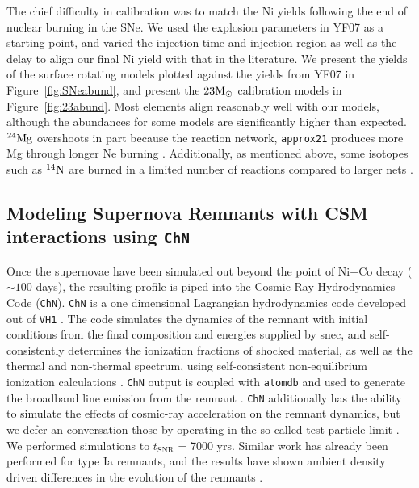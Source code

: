 \documentclass[twocolumn]{aastex631}
\begin{document}
The chief difficulty in calibration was to match the Ni yields following the end of nuclear burning in the SNe. We used the explosion parameters in YF07 as a starting point, and varied the injection time and injection region as well as the delay to align our final Ni yield with that in the literature. We present the yields of the surface rotating models plotted against the yields from YF07 in Figure~\ref{fig:SNeabund}, and present the $23\rm M_{\odot}$ calibration models in Figure~\ref{fig:23abund}. Most elements align reasonably well with our models, although the abundances for some models are significantly higher than expected.  ${}^{24} \rm Mg$ overshoots in part because the reaction network, \texttt{approx21} produces more Mg through longer Ne burning \citep{farmer16}. Additionally, as mentioned above, some isotopes such as ${}^{14} \rm N$ are burned in a limited number of reactions compared to larger nets \citep{approx21,paxton1}.

\subsection{Modeling Supernova Remnants with CSM interactions using \texttt{ChN}}
\label{chn}
\indent Once the supernovae have been simulated out beyond the point of Ni+Co decay ($\sim 100$ days), the resulting profile is piped into the Cosmic-Ray Hydrodynamics Code (\texttt{ChN}). \texttt{ChN} is a one dimensional Lagrangian hydrodynamics code developed out of \texttt{VH1} \citep{vh1}. The code simulates the dynamics of the remnant with initial conditions from the final composition and energies supplied by snec, and self-consistently determines the ionization fractions of shocked material, as well as the thermal and non-thermal spectrum, using self-consistent non-equilibrium ionization calculations \citep{ChN1,ChN2,ChN3}. \texttt{ChN} output is coupled with \texttt{atomdb} and used to generate the broadband line emission from the remnant \citep{hehadb,atomdbconf}. \texttt{ChN} additionally has the ability to simulate the effects of cosmic-ray acceleration on the remnant dynamics, but we defer an conversation those by operating in the so-called test particle limit \citep{ellison07}. We performed simulations to $t_{\mathrm{SNR}}$ = 7000 yrs. Similar work has already been performed for type Ia remnants, and the results have shown ambient density driven differences in the evolution of the remnants \citep{chnIa}.
\end{document}
